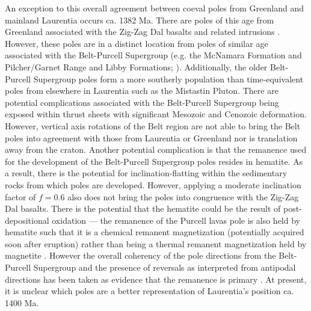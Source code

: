\documentclass[twocolumn, switch]{article} %
\begin{document}
An exception to this overall agreement between coeval poles from Greenland and mainland Laurentia occurs ca. 1382 Ma. There are poles of this age from Greenland associated with the Zig-Zag Dal basalts and related intrusions \citep{Marcussen1983a, Abrahamsen1987a}. However, these poles are in a distinct location from poles of similar age associated with the Belt-Purcell Supergroup (e.g. the McNamara Formation and Pilcher/Garnet Range and Libby Formations; \citealp{Elston2002a}). Additionally, the older Belt-Purcell Supergroup poles form a more southerly population than time-equivalent poles from elsewhere in Laurentia such as the Mistastin Pluton. There are potential complications associated with the Belt-Purcell Supergroup being exposed within thrust sheets with significant Mesozoic and Cenozoic deformation. However, vertical axis rotations of the Belt region are not able to bring the Belt poles into agreement with those from Laurentia or Greenland nor is translation away from the craton. Another potential complication is that the remanence used for the development of the Belt-Purcell Supergroup poles resides in hematite. As a result, there is the potential for inclination-flatting within the sedimentary rocks from which poles are developed. However, applying a moderate inclination factor of $f=0.6$ also does not bring the poles into congruence with the Zig-Zag Dal basalts. There is the potential that the hematite could be the result of post-depositional oxidation --- the remanence of the Purcell lavas pole is also held by hematite such that it is a chemical remanent magnetization (potentially acquired soon after eruption) rather than being a thermal remanent magnetization held by magnetite \citep{Elston2002a}. However the overall coherency of the pole directions from the Belt-Purcell Supergroup and the presence of reversals as interpreted from antipodal directions has been taken as evidence that the remanence is primary \citep{Elston2002a}. At present, it is unclear which poles are a better representation of Laurentia's position ca. 1400 Ma.
\end{document}
